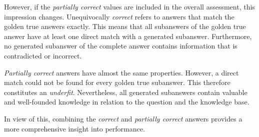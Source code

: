 However, if the \textit{partially correct} values are included in the overall assessment, this impression changes.
Unequivocally \textit{correct} refers to answers that match the golden true answers exactly.
This means that all subanswers of the golden true answer have at least one direct match with a generated subanswer.
Furthermore, no generated subanswer of the complete answer contains information that is contradicted or incorrect. 

\textit{Partially correct} answers have almost the same properties.
However, a direct match could not be found for every golden true subanswer.
This therefore constitutes an \textit{underfit}.
Nevertheless, all generated subanswers contain valuable and well-founded knowledge in relation to the question and the knowledge base.

In view of this, combining the \textit{correct} and \textit{partially correct} answers provides a more comprehensive insight into performance.

